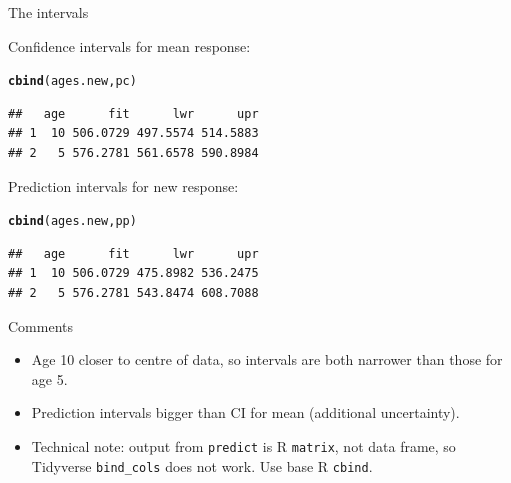 \documentclass[unknownkeysallowed]{beamer}\usepackage[]{graphicx}\usepackage[]{color}
\makeatletter
\newcommand{\hlstd}[1]{\textcolor[rgb]{0.345,0.345,0.345}{#1}}%
\newcommand{\hlkwd}[1]{\textcolor[rgb]{0.737,0.353,0.396}{\textbf{#1}}}%
\newenvironment{kframe}{%
 \def\at@end@of@kframe{}%
 \ifinner\ifhmode%
  \def\at@end@of@kframe{\end{minipage}}%
  \begin{minipage}{\columnwidth}%
 \fi\fi%
 \def\FrameCommand##1{\hskip\@totalleftmargin \hskip-\fboxsep
 \colorbox{shadecolor}{##1}\hskip-\fboxsep
     \hskip-\linewidth \hskip-\@totalleftmargin \hskip\columnwidth}%
 \MakeFramed {\advance\hsize-\width
   \@totalleftmargin\z@ \linewidth\hsize
   \@setminipage}}%
 {\par\unskip\endMakeFramed%
 \at@end@of@kframe}
\newenvironment{knitrout}{}{} %
\makeatother
\begin{document}
\begin{frame}[fragile]{The intervals}
  
Confidence intervals for mean response:

 
\begin{knitrout}
\color{fgcolor}\begin{kframe}
\begin{alltt}
\hlkwd{cbind}\hlstd{(ages.new,pc)}
\end{alltt}
\begin{verbatim}
##   age      fit      lwr      upr
## 1  10 506.0729 497.5574 514.5883
## 2   5 576.2781 561.6578 590.8984
\end{verbatim}
\end{kframe}
\end{knitrout}

Prediction intervals for new response:

 
\begin{knitrout}
\color{fgcolor}\begin{kframe}
\begin{alltt}
\hlkwd{cbind}\hlstd{(ages.new,pp)}
\end{alltt}
\begin{verbatim}
##   age      fit      lwr      upr
## 1  10 506.0729 475.8982 536.2475
## 2   5 576.2781 543.8474 608.7088
\end{verbatim}
\end{kframe}
\end{knitrout}


  
\end{frame}


\begin{frame}[fragile]{Comments}

\begin{itemize}
\item Age 10 closer to centre of data, so intervals are both narrower than those for age 5.
\item Prediction intervals bigger than CI for mean (additional uncertainty).
\item Technical note: output from \texttt{predict} is R
  \texttt{matrix}, not data frame, so Tidyverse \texttt{bind\_cols}
  does not work. Use base R \texttt{cbind}.
\end{itemize}

\end{frame}
\end{document}
